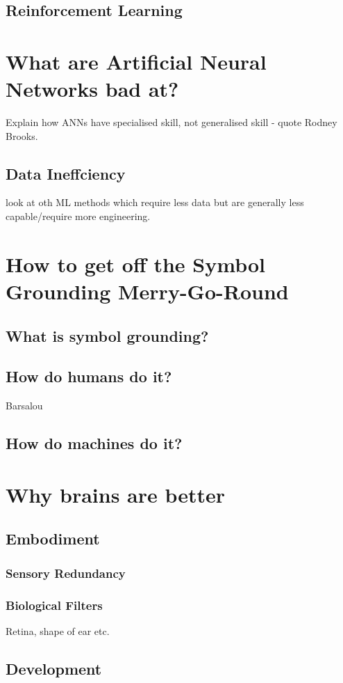 \subsection{Reinforcement Learning}

\section{What are Artificial Neural Networks bad at?}
Explain how ANNs have specialised skill, not generalised skill - quote Rodney Brooks.
\subsection{Data Ineffciency}
look at oth ML methods which require less data but are generally less capable/require more engineering.


\section{How to get off the Symbol Grounding Merry-Go-Round} 
\subsection{What is symbol grounding?}
\subsection{How do humans do it?}
Barsalou

\subsection{How do machines do it?}

\section{Why brains are better}
\subsection{Embodiment}
\subsubsection{Sensory Redundancy}
\subsubsection{Biological Filters}
Retina, shape of ear etc.
\subsection{Development}
